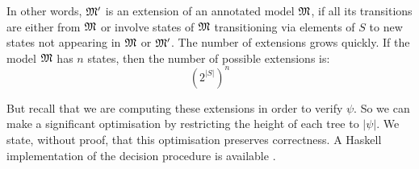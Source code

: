 \NI In other words, $\frak{M}'$ is an extension of an annotated model
$\frak{M}$, if all its transitions are either from $\frak{M}$ or involve
states of $\frak{M}$ transitioning via elements of $S$ to new states not
appearing in $\frak{M}$ or $\frak{M}'$.  The number of extensions grows
quickly.  If the model $\frak{M}$ has $n$ states, then the number of
possible extensions is:
\[
   ({2^{|S|}})^n
\] 

\NI But recall that we are computing these extensions in order to
verify $\psi$. So we can make a significant optimisation by
restricting the height of each tree to $|\psi|$. We state, without proof, that this optimisation preserves correctness.
A Haskell implementation of the decision procedure is available
\cite{HaskellImplementation}.
